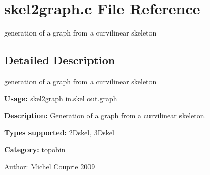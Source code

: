 \section{skel2graph.c File Reference}
\label{skel2graph_8c}
generation of a graph from a curvilinear skeleton  




\label{_details}
\subsection{Detailed Description}
generation of a graph from a curvilinear skeleton 

{\bf Usage:} skel2graph in.skel out.graph

{\bf Description:} Generation of a graph from a curvilinear skeleton.

{\bf Types supported:} 2Dskel, 3Dskel

{\bf Category:} topobin

\begin{Desc}
\item[Author:]Michel Couprie 2009 \end{Desc}
